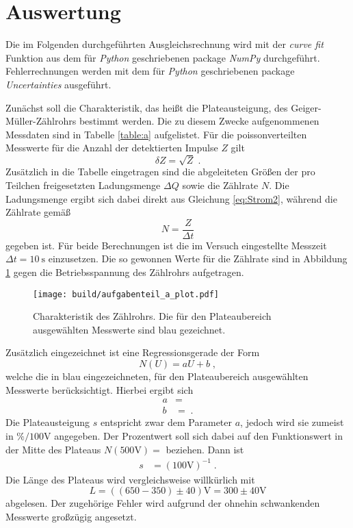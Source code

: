 \section{Auswertung}
\label{sec:Auswertung}
Die im Folgenden durchgeführten Ausgleichsrechnung wird mit der \emph{curve fit} Funktion aus dem für \emph{Python} geschriebenen package \emph{NumPy}\cite{scipy} durchgeführt. Fehlerrechnungen werden mit dem für \emph{Python} geschriebenen package \emph{Uncertainties}\cite{uncertainties} ausgeführt.

Zunächst soll die Charakteristik, das heißt die Plateausteigung, des Geiger-Müller-Zählrohrs bestimmt werden. Die zu diesem Zwecke aufgenommenen Messdaten sind in Tabelle \ref{table:a} aufgelistet. Für die poissonverteilten Messwerte für die Anzahl der detektierten Impulse $Z$ gilt
\begin{equation}
  \delta Z = \sqrt{Z} \; .
\end{equation}
Zusätzlich in die Tabelle eingetragen sind die abgeleiteten Größen der pro Teilchen freigesetzten Ladungsmenge $\Delta Q$ sowie die Zählrate $N$. Die Ladungsmenge ergibt sich dabei direkt aus Gleichung \eqref{eq:Strom2}, während die Zählrate gemäß
\begin{equation}
  N = \frac{Z}{\Delta t}
\end{equation}
gegeben ist. Für beide Berechnungen ist die im Versuch eingestellte Messzeit $\Delta t = \SI{10}{\second}$ einzusetzen. Die so gewonnen Werte für die Zählrate sind in Abbildung \ref{fig:plot} gegen die Betriebsspannung des Zählrohrs aufgetragen.

\begin{figure}
  \centering
  \texttt{[image: build/aufgabenteil\_a\_plot.pdf]}
  \caption{Charakteristik des Zählrohrs. Die für den Plateaubereich ausgewählten Messwerte sind blau gezeichnet.}
  \label{fig:plot}
\end{figure}
Zusätzlich eingezeichnet ist eine Regressionsgerade der Form
\begin{equation*}
  N(U) = aU +b \; ,
\end{equation*}
welche die in blau eingezeichneten, für den Plateaubereich ausgewählten Messwerte berücksichtigt. Hierbei ergibt sich
\begin{align*}
    a &=  \\
    b &=  \; .
\end{align*}
Die Plateausteigung $s$ entspricht zwar dem Parameter $a$, jedoch wird sie zumeist in $\%/100\si{\volt}$ angegeben. Der Prozentwert soll sich dabei auf den Funktionswert in der Mitte des Plateaus $N (500\si{\volt}) = $ beziehen. Dann ist
\begin{align*}
  s &= (100\si{\volt})^{-1} \; .
\end{align*}
Die Länge des Plateaus wird vergleichsweise willkürlich mit
\begin{equation*}
  L = ((650-350)\pm 40)\si{\volt} = 300\pm 40 \si{\volt}
\end{equation*}
abgelesen. Der zugehörige Fehler wird aufgrund der ohnehin schwankenden Messwerte großzügig angesetzt.

